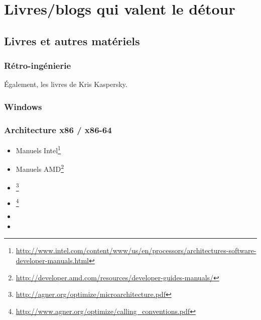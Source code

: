 \chapter{Livres/blogs qui valent le détour}

\section{Livres et autres matériels}

\subsection{Rétro-ingénierie}



Également, les livres de Kris Kaspersky.

\subsection{Windows}



\subsection{\CCpp}



\subsection{Architecture x86 / x86-64}

\label{x86_manuals}
\begin{itemize}
\item Manuels Intel\footnote{\AlsoAvailableAs \url{http://www.intel.com/content/www/us/en/processors/architectures-software-developer-manuals.html}}

\item Manuels AMD\footnote{\AlsoAvailableAs \url{http://developer.amd.com/resources/developer-guides-manuals/}}

\item \AgnerFog{}\footnote{\AlsoAvailableAs \url{http://agner.org/optimize/microarchitecture.pdf}}

\item \AgnerFogCC{}\footnote{\AlsoAvailableAs \url{http://www.agner.org/optimize/calling_conventions.pdf}}

\item \IntelOptimization

\item \AMDOptimization
\end{itemize}

